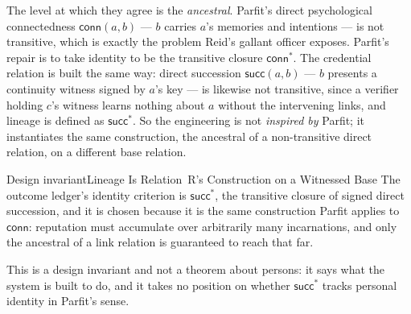 \documentclass[11pt,a4paper]{article}
\theoremstyle{definition}
\begin{document}
%
The level at which they agree is the \emph{ancestral}. Parfit's direct
psychological connectedness $\mathsf{conn}(a,b)$ --- $b$ carries $a$'s memories
and intentions --- is not transitive, which is exactly the problem Reid's
gallant officer exposes. Parfit's repair is to take identity to be the
transitive closure $\mathsf{conn}^{*}$. The credential relation is built the
same way: direct succession $\mathsf{succ}(a,b)$ --- $b$ presents a continuity
witness signed by $a$'s key --- is likewise not transitive, since a verifier
holding $c$'s witness learns nothing about $a$ without the intervening links,
and lineage is defined as $\mathsf{succ}^{*}$. So the engineering is not
\emph{inspired by} Parfit; it instantiates the same construction, the ancestral
of a non-transitive direct relation, on a different base relation.

\begin{pdclaim}{Design invariant}{Lineage Is Relation~R's Construction on a
\setlength{\parskip}{4pt plus 1pt}
Witnessed Base}
\label{inv:parfit-lineage}
The outcome ledger's identity criterion is $\mathsf{succ}^{*}$, the transitive
closure of signed direct succession, and it is chosen because it is the same
construction Parfit applies to $\mathsf{conn}$: reputation must accumulate over
arbitrarily many incarnations, and only the ancestral of a link relation is
guaranteed to reach that far. 

This is a design invariant and not a theorem
about persons: it says what the system is built to do, and it takes no position
on whether $\mathsf{succ}^{*}$ tracks personal identity in Parfit's sense.
\end{pdclaim}
\end{document}
